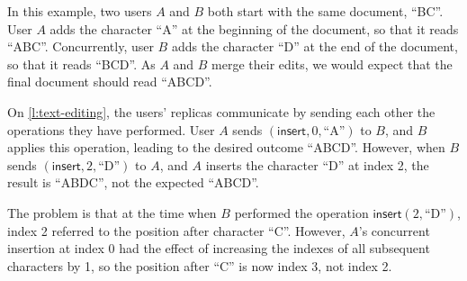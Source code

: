 \begin{frame}
\begin{center}
    \end{center}
\end{frame}
\label{l:text-editing}

In this example, two users $A$ and $B$ both start with the same document, ``BC''.
User $A$ adds the character ``A'' at the beginning of the document, so that it reads ``ABC''.
Concurrently, user $B$ adds the character ``D'' at the end of the document, so that it reads ``BCD''.
As $A$ and $B$ merge their edits, we would expect that the final document should read ``ABCD''.

On \autoref{l:text-editing}, the users' replicas communicate by sending each other the operations they have performed.
User $A$ sends $(\mathsf{insert}, 0, \text{``A''})$ to $B$, and $B$ applies this operation, leading to the desired outcome ``ABCD''.
However, when $B$ sends $(\mathsf{insert}, 2, \text{``D''})$ to $A$, and $A$ inserts the character ``D'' at index 2, the result is ``ABDC'', not the expected ``ABCD''.

The problem is that at the time when $B$ performed the operation $\mathsf{insert}(2, \text{``D''})$, index 2 referred to the position after character ``C''.
However, $A$'s concurrent insertion at index 0 had the effect of increasing the indexes of all subsequent characters by 1, so the position after ``C'' is now index 3, not index 2.

